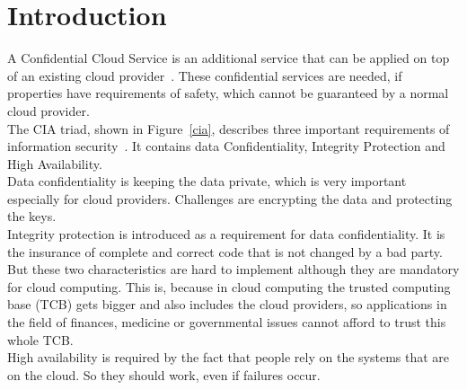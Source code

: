 \section{Introduction}
	A Confidential Cloud Service is an additional service that can be applied on top of an existing cloud provider~\cite{confidentiality}. These confidential services are needed, if properties have requirements of safety, which cannot be guaranteed by a normal cloud provider.   \\
	 The CIA triad,  shown in Figure~\ref{cia},  describes three important requirements of information security~\cite{ciaBook, cia}. It contains data Confidentiality, Integrity Protection and High Availability.\\
	  Data confidentiality is keeping the data private, which is very important especially for cloud providers. Challenges are encrypting the data and protecting the keys.\\
	   Integrity protection is introduced as a requirement for data confidentiality. It is the insurance of complete and correct code that is not changed by a bad party. But these two characteristics are hard to implement although they are mandatory for cloud computing. This is, because in cloud computing the trusted computing base (TCB) gets bigger and also includes the cloud providers, so applications in the field of finances, medicine or governmental issues cannot afford to trust this whole TCB.\\
	    High availability is required by the fact that people rely on the systems that are on the cloud. So they should work, even if failures occur.\\
	 